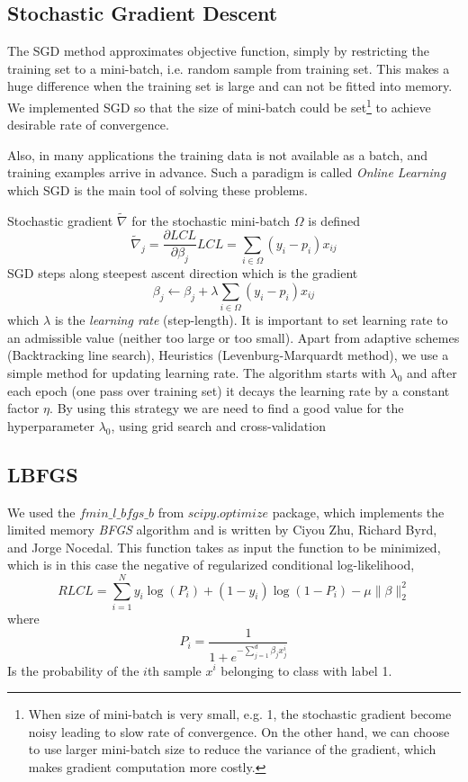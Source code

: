 \documentclass[twoside,12pt]{article}
\begin{document}
\subsection{Stochastic Gradient Descent}
The SGD method approximates objective function, simply by restricting the training set to a mini-batch, i.e. random sample from training set. 
This makes a huge difference when the training set is large and can not be fitted into memory. We implemented SGD so that the size of mini-batch could be set\footnote{When size of mini-batch is very small, e.g. 1, the stochastic gradient become noisy leading to slow rate of convergence. On the other hand, we can choose to use larger mini-batch size to reduce the variance of the gradient, which makes gradient computation more costly.} to achieve desirable rate of convergence. 

Also, in many applications the training data is not available as a batch, and training examples arrive in advance. Such a paradigm is called \emph{Online Learning} which SGD is the main tool of solving these problems.

Stochastic gradient $\tilde{\nabla}$ for the stochastic mini-batch $\Omega$ is defined
\begin{equation}
\tilde{\nabla}_j=\frac{\partial LCL }{\partial \beta_j}LCL=\sum_{i \in \Omega} (y_i-p_i)x_{ij}
\label{eq:pLCL}
\end{equation}
SGD steps along steepest ascent direction which is the gradient 
\begin{equation}
\beta_j \leftarrow \beta_j+ \lambda \sum_{i \in \Omega} (y_i-p_i)x_{ij}
\end{equation}
which $\lambda$ is the \emph{learning rate} (step-length). It is important to set learning rate to an admissible value (neither too large or too small). Apart from adaptive schemes (Backtracking line search), Heuristics (Levenburg-Marquardt method), we use a simple method for updating learning rate. The algorithm starts with $\lambda_0$ and after each epoch (one pass over training set) it decays the learning rate by a constant factor $\eta$. By using this strategy we are need to find a good value for the hyperparameter $\lambda_0$, using grid search and cross-validation


\subsection{LBFGS}
We used the $fmin\_l\_bfgs\_b$ from $scipy.optimize$ package, which implements the limited memory {\it BFGS} algorithm and is written by Ciyou Zhu, Richard Byrd, and Jorge Nocedal. This function takes as input the function to be minimized, which is in this case the negative of regularized conditional log-likelihood,
\begin{equation}
RLCL = \sum_{i=1}^N y_i \log(P_i) + (1-y_i)\log(1 - P_i) - \mu \|\beta\|_2^2
\end{equation}
where 
\begin{equation}
P_i = \frac{1}{1+e^{-\sum_{j=1}^d \beta_j x^i_j}}
\end{equation}
Is the probability of the $i$th sample $x^i$ belonging to class with label 1. 
\end{document}
